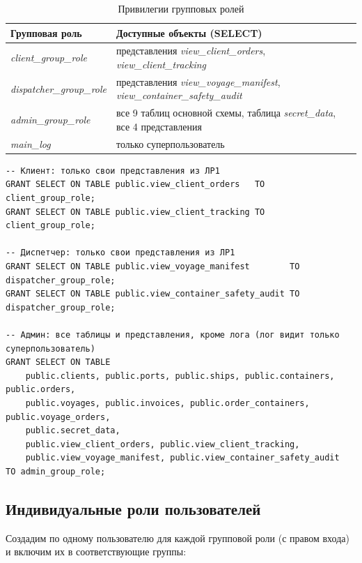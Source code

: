 \documentclass[a4paper,14pt]{article}
\begin{document}
\begin{table}[h!]
    \caption{Привилегии групповых ролей}
    \label{tab:privs}
    \small
    \begin{tabularx}{\textwidth}{|l|X|}
        \hline
        \textbf{Групповая роль}          & \textbf{Доступные объекты (SELECT)}                                                    \\ \hline
        \textit{client\_group\_role}     & представления \textit{view\_client\_orders}, \textit{view\_client\_tracking}           \\ \hline
        \textit{dispatcher\_group\_role} & представления \textit{view\_voyage\_manifest}, \textit{view\_container\_safety\_audit} \\ \hline
        \textit{admin\_group\_role}      & все 9 таблиц основной схемы, таблица \textit{secret\_data}, все 4 представления        \\ \hline
        \textit{main\_log}               & только суперпользователь                                                               \\ \hline
    \end{tabularx}
\end{table}

\begin{lstlisting}
-- Клиент: только свои представления из ЛР1
GRANT SELECT ON TABLE public.view_client_orders   TO client_group_role;
GRANT SELECT ON TABLE public.view_client_tracking TO client_group_role;

-- Диспетчер: только свои представления из ЛР1
GRANT SELECT ON TABLE public.view_voyage_manifest        TO dispatcher_group_role;
GRANT SELECT ON TABLE public.view_container_safety_audit TO dispatcher_group_role;

-- Админ: все таблицы и представления, кроме лога (лог видит только суперпользователь)
GRANT SELECT ON TABLE
    public.clients, public.ports, public.ships, public.containers, public.orders,
    public.voyages, public.invoices, public.order_containers, public.voyage_orders,
    public.secret_data,
    public.view_client_orders, public.view_client_tracking,
    public.view_voyage_manifest, public.view_container_safety_audit
TO admin_group_role;
\end{lstlisting}

\subsection{Индивидуальные роли пользователей}
Создадим по одному пользователю для каждой групповой роли (с правом входа) и включим их в соответствующие группы:
\end{document}
